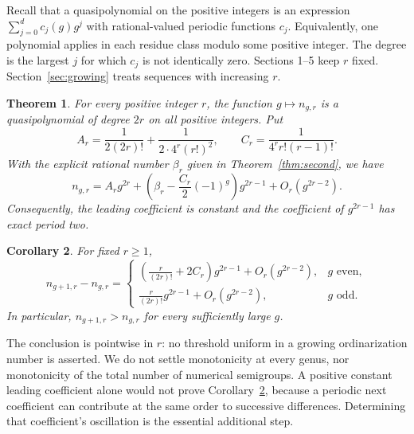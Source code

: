 \documentclass[11pt]{article}
\newtheorem{theorem}{Theorem}[section]
\newtheorem{corollary}[theorem]{Corollary}
\theoremstyle{remark}\newtheorem{remark}[theorem]{Remark}
\begin{document}
Recall that a quasipolynomial on the positive integers is an expression $\sum_{j=0}^d c_j(g)g^j$ with rational-valued periodic functions $c_j$. Equivalently, one polynomial applies in each residue class modulo some positive integer. The degree is the largest $j$ for which $c_j$ is not identically zero. Sections 1--5 keep $r$ fixed. Section~\ref{sec:growing} treats sequences with increasing $r$.

\begin{theorem}\label{thm:main}
For every positive integer $r$, the function $g\mapsto n_{g,r}$ is a quasipolynomial of degree $2r$ on all positive integers. Put
\begin{equation}\label{eq:constants}
 A_r=\frac{1}{2(2r)!}+\frac{1}{2\cdot4^r(r!)^2},
 \qquad C_r=\frac{1}{4^r r!(r-1)!}.
\end{equation}
With the explicit rational number $\beta_r$ given in Theorem~\ref{thm:second}, we have
\begin{equation}\label{eq:main}
 n_{g,r}=A_r g^{2r}
   +\left(\beta_r-\frac{C_r}{2}(-1)^g\right)g^{2r-1}
   +O_r(g^{2r-2}).
\end{equation}
Consequently, the leading coefficient is constant and the coefficient of $g^{2r-1}$ has exact period two.
\end{theorem}

\begin{corollary}\label{cor:growth}
For fixed $r\ge1$,
\begin{equation}\label{eq:increment}
 n_{g+1,r}-n_{g,r}=
 \begin{cases}
 \displaystyle\left(\frac{r}{(2r)!}+2C_r\right)g^{2r-1}
                  +O_r(g^{2r-2}),&g\text{ even},\\[4pt]
 \displaystyle\frac{r}{(2r)!}g^{2r-1}
                  +O_r(g^{2r-2}),&g\text{ odd}.
 \end{cases}
\end{equation}
In particular, $n_{g+1,r}>n_{g,r}$ for every sufficiently large $g$.
\end{corollary}

The conclusion is pointwise in $r$: no threshold uniform in a growing ordinarization number is asserted. We do not settle monotonicity at every genus, nor monotonicity of the total number of numerical semigroups. A positive constant leading coefficient alone would not prove Corollary~\ref{cor:growth}, because a periodic next coefficient can contribute at the same order to successive differences. Determining that coefficient's oscillation is the essential additional step.
\end{document}
